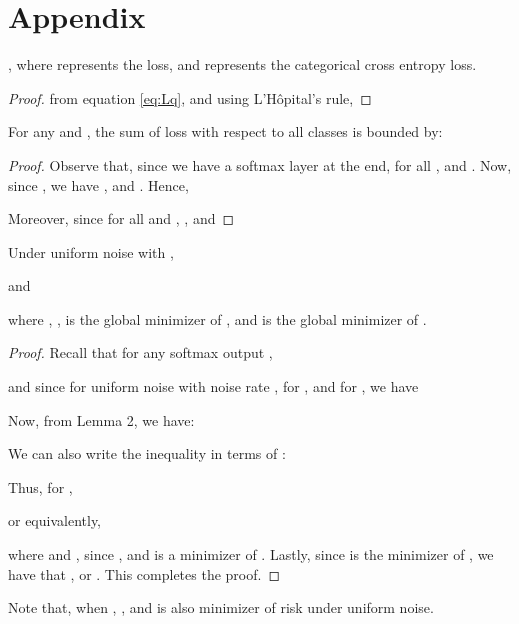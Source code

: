 \documentclass{article}
\begin{document}
\section*{Appendix}
\begin{lemma}
, where  represents the  loss, and  represents the categorical cross entropy loss.  
\end{lemma}
\begin{proof}
from equation \ref{eq:Lq}, and using L'Hôpital's rule,

\end{proof}

\begin{lemma}
For any  and , the sum of  loss with respect to all classes is bounded by:

\end{lemma}
\begin{proof}
Observe that, since we have a softmax layer at the end,  for all , and . Now, since , we have , and . Hence, 

Moreover, since  for all  and , ,
and 

\end{proof}

\begin{theorem}
Under uniform noise with ,

and

where , ,  is the global minimizer of , and  is the global minimizer of .
\end{theorem}
\begin{proof}
Recall that for any softmax output , 

and since for uniform noise with noise rate ,  for , and  for , we have

 
Now, from Lemma 2, we have:

We can also write the inequality in terms of :

Thus, for ,  

or equivalently, 

where  and , since , and  is a minimizer of  . Lastly, since  is the minimizer of , we have that , or  . This completes the proof.
\end{proof}
\begin{remark}
Note that, when , , and  is also minimizer of risk under uniform noise. 
\end{remark}
\end{document}
